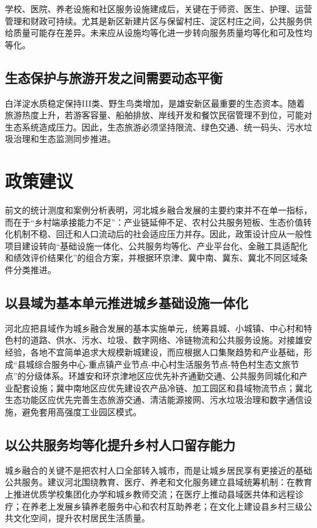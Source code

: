 \documentclass[UTF8,zihao=-4]{ctexart}
\begin{document}
学校、医院、养老设施和社区服务设施建成后，关键在于师资、医生、护理、运营管理和财政可持续。尤其是新区新建片区与保留村庄、淀区村庄之间，公共服务供给质量可能存在差异。未来应从设施均等化进一步转向服务质量均等化和可及性均等化。

\subsection{生态保护与旅游开发之间需要动态平衡}

白洋淀水质稳定保持III类、野生鸟类增加，是雄安新区最重要的生态资本。随着旅游热度上升，若游客容量、船舶排放、岸线开发和餐饮民宿管理不到位，可能对生态系统造成压力。因此，生态旅游必须坚持限流、绿色交通、统一码头、污水垃圾治理和生态监测同步推进。

\section{政策建议}

前文的统计测度和案例分析表明，河北城乡融合发展的主要约束并不在单一指标，而在于“乡村端承接能力不足”：产业链延伸不足、农村公共服务短板、生态价值转化机制不稳、回迁和人口流动后的社会适应压力并存。因此，政策设计应从一般性项目建设转向“基础设施一体化、公共服务均等化、产业平台化、金融工具适配化和绩效评价结果化”的组合方案，并根据环京津、冀中南、冀东、冀北不同区域条件分类推进。

\subsection{以县域为基本单元推进城乡基础设施一体化}

河北应把县域作为城乡融合发展的基本实施单元，统筹县城、小城镇、中心村和特色村的道路、供水、污水、垃圾、数字网络、冷链物流和公共服务设施。对接雄安经验，各地不宜简单追求大规模新城建设，而应根据人口集聚趋势和产业基础，形成“县城综合服务中心-重点镇产业节点-中心村生活服务节点-特色村生态文旅节点”的分级体系。环雄安和环京津地区应优先补齐通勤交通、公共服务同城化和产业配套设施；冀中南地区应优先建设农产品冷链、加工园区和县域物流节点；冀北生态功能区应优先完善生态旅游交通、清洁能源接网、污水垃圾治理和数字通信设施，避免套用高强度工业园区模式。

\subsection{以公共服务均等化提升乡村人口留存能力}

城乡融合的关键不是把农村人口全部转入城市，而是让城乡居民享有更接近的基础公共服务。建议河北围绕教育、医疗、养老和文化服务建立县域统筹机制：在教育上推进优质学校集团化办学和城乡教师交流；在医疗上推动县域医共体和远程诊疗；在养老上发展乡镇养老服务中心和农村互助养老；在文化上建设县乡村三级公共文化空间，提升农村居民生活质量。
\end{document}
